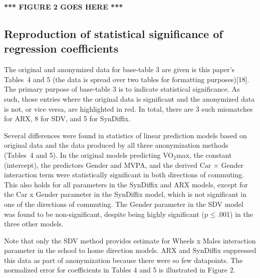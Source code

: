 \documentclass[10pt]{article}
\newcommand{\mycite}[1]{[#1]}
\begin{document}

\textbf{*** FIGURE 2 GOES HERE ***}

\subsection*{Reproduction of statistical significance of regression coefficients}

The original and anonymized data for base-table 3 are given is this paper's Tables~4 and 5 (the data is spread over two tables for formatting purposes)\mycite{18}. The primary purpose of base-table 3 is to indicate statistical significance. As such, those entries where the original data is significant and the anonymized data is not, or vice versa, are highlighted in red. In total, there are 3 such mismatches for ARX, 8 for SDV, and 5 for SynDiffix.

Several differences were found in statistics of linear prediction models based on original data and the data produced by all three anonymization methods (Tables~4 and 5). In the original models predicting VO$_2$max, the constant (intercept), the predictors Gender and MVPA, and the derived Car × Gender interaction term were statistically significant in both directions of commuting. This also holds for all parameters in the SynDiffix and ARX models, except for the Car x Gender parameter in the SynDiffix model, which is not significant in one of the directions of commuting. The Gender parameter in the SDV model was found to be non-significant, despite being highly significant (p$\leq$.001) in the three other models.

Note that only the SDV method provides estimate for Wheels x Males interaction parameter in the school to home direction models. ARX and SynDiffix suppressed this data as part of anonymization because there were so few datapoints.
%
The normalized error for coefficients in Tables 4 and 5 is illustrated in Figure 2.
\end{document}
